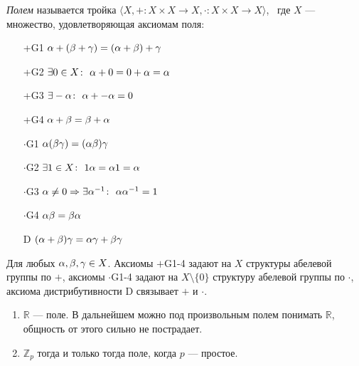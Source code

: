 \begin{definition}
    \textit{Полем} называется тройка $\langle X, + \colon X \times X \to X,
    \cdot \colon X \times X \to X \rangle$, \, где $X$ --- множество,
    удовлетворяющая аксиомам поля:
    \begin{itemize}
        \item[+G1] $\alpha + (\beta + \gamma) = (\alpha + \beta) + \gamma$
        \item[+G2] $\exists 0 \in X \colon~ \alpha + 0 = 0 + \alpha = \alpha$
        \item[+G3] $\exists -\alpha \colon~ \alpha + -\alpha = 0$
        \item[+G4] $\alpha + \beta = \beta + \alpha$
        \item[$\cdot$G1] $\alpha(\beta\gamma) = (\alpha\beta)\gamma$
        \item[$\cdot$G2] $\exists 1 \in X \colon~ 1\alpha = \alpha1 = \alpha$
        \item[$\cdot$G3] $\alpha \neq 0 \Rightarrow \exists \alpha^{-1} \colon~
         \alpha\alpha^{-1} = 1$
        \item[$\cdot$G4] $\alpha\beta = \beta\alpha$
        \item[D] $(\alpha + \beta)\gamma = \alpha\gamma + \beta\gamma$
    \end{itemize}
Для любых $\alpha, \beta, \gamma \in X$. Аксиомы $+$G1-4 задают на $X$ структуры
абелевой группы по $+$, аксиомы $\cdot$G1-4 задают на $X \setminus \{0\}$
структуру абелевой группы по $\cdot$, аксиома дистрибутивности D связывает $+$
и $\cdot$.
\end{definition}
\begin{examples}
    \enewline
    \begin{enumerate}
        \item $\mathbb{R}$ --- поле. В дальнейшем можно под произвольным полем
        понимать $\mathbb{R}$, общность от этого сильно не пострадает.
        \item $\mathbb{Z}_p$ тогда и только тогда поле, когда $p$ --- простое.
    \end{enumerate}
\end{examples}

